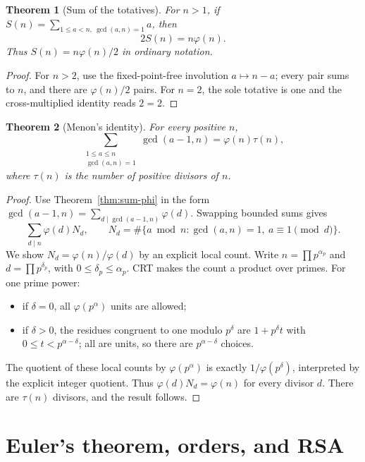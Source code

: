 \documentclass[11pt]{article}
\newtheorem{theorem}{Theorem}[section]
\theoremstyle{definition}
\begin{document}
\begin{theorem}[Sum of the totatives]\label{thm:sum-totatives}
For \(n>1\), if
\(S(n)=\sum_{1\le a<n,\ \gcd(a,n)=1}a\), then
\[
 \boxed{2S(n)=n\varphi(n).}
\]
Thus \(S(n)=n\varphi(n)/2\) in ordinary notation.
\end{theorem}

\begin{proof}
For \(n>2\), use the fixed-point-free involution
\(a\mapsto n-a\); every pair sums to \(n\), and there are
\(\varphi(n)/2\) pairs.  For \(n=2\), the sole totative is one and the
cross-multiplied identity reads \(2=2\).
\end{proof}

\begin{theorem}[Menon's identity]\label{thm:menon}
For every positive \(n\),
\[
 \boxed{\displaystyle
 \sum_{\substack{1\le a\le n\\\gcd(a,n)=1}}\gcd(a-1,n)
 =\varphi(n)\tau(n),}
\]
where \(\tau(n)\) is the number of positive divisors of \(n\).
\end{theorem}

\begin{proof}
Use Theorem~\ref{thm:sum-phi} in the form
\(\gcd(a-1,n)=\sum_{d\mid\gcd(a-1,n)}\varphi(d)\).  Swapping bounded sums gives
\[
 \sum_{d\mid n}\varphi(d)N_d,
 \qquad
 N_d=\#\{a\bmod n:\gcd(a,n)=1,\ a\equiv1\pmod d\}.
\]
We show \(N_d=\varphi(n)/\varphi(d)\) by an explicit local count.  Write
\(n=\prod p^{\alpha_p}\) and
\(d=\prod p^{\delta_p}\), with
\(0\le\delta_p\le\alpha_p\).  CRT makes the count a product over primes.
For one prime power:
\begin{itemize}
\item if \(\delta=0\), all \(\varphi(p^\alpha)\) units are allowed;
\item if \(\delta>0\), the residues congruent to one modulo \(p^\delta\)
are \(1+p^\delta t\) with \(0\le t<p^{\alpha-\delta}\); all are units, so
there are \(p^{\alpha-\delta}\) choices.
\end{itemize}
The quotient of these local counts by \(\varphi(p^\alpha)\) is exactly
\(1/\varphi(p^\delta)\), interpreted by the explicit integer quotient.  Thus
\(\varphi(d)N_d=\varphi(n)\) for every divisor \(d\).  There are \(\tau(n)\)
divisors, and the result follows.
\end{proof}

\section{Euler's theorem, orders, and RSA}
\end{document}
